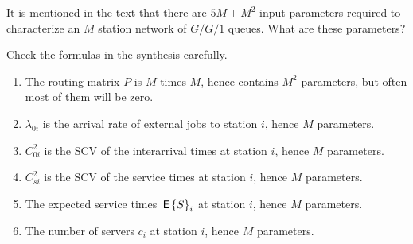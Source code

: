 \begin{question}
  It is mentioned in the text that there are $5M+M^2$ input parameters
  required to characterize an $M$ station network of $G/G/1$ queues. What are these parameters?
  \begin{hint}
 Check the formulas in the synthesis carefully.
  \end{hint}
  \begin{solution}
    \begin{enumerate}
    \item The routing matrix $P$ is $M$ times $M$, hence contains
      $M^2$ parameters, but often most of them will be zero.
    \item $\lambda_{0i}$ is the arrival rate of external jobs to station $i$, hence $M$ parameters.
    \item $C_{0i}^2$ is the SCV of the interarrival times at station
      $i$, hence $M$ parameters.
    \item $C_{si}^2$ is the SCV of the service times at station $i$,
      hence $M$ parameters.
    \item The expected service times $\,\mathsf{E}\left\{S\right\}_i$ at station $i$, 
      hence $M$ parameters.
    \item The number of servers $c_i$ at station $i$, hence $M$
      parameters.
    \end{enumerate}
  \end{solution}
\end{question}


